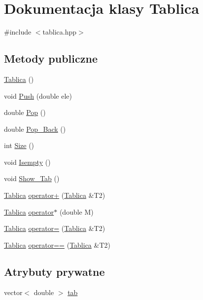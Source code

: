 \hypertarget{class_tablica}{\section{Dokumentacja klasy Tablica}
\label{class_tablica}
}


{\ttfamily \#include $<$tablica.\-hpp$>$}

\subsection*{Metody publiczne}
\begin{DoxyCompactItemize}
\item 
\hyperlink{class_tablica_a5f484e7b0478e1ff9b62e894f9d7b28d}{Tablica} ()
\item 
void \hyperlink{class_tablica_ae1af903a66629cd0d522eb9f2fd13116}{Push} (double ele)
\item 
double \hyperlink{class_tablica_a6153881ffda3f5361c2d664622a4eff4}{Pop} ()
\item 
double \hyperlink{class_tablica_a899c8e69cb97bd027c1c05140cd304ec}{Pop\-\_\-\-Back} ()
\item 
int \hyperlink{class_tablica_a8598f952095406441bfd2d20e76f175c}{Size} ()
\item 
void \hyperlink{class_tablica_a08b59415756d2dc7da781124809d8eb4}{Isempty} ()
\item 
void \hyperlink{class_tablica_a06c551a7e0220dde2f29cce06fb96209}{Show\-\_\-\-Tab} ()
\item 
\hyperlink{class_tablica}{Tablica} \hyperlink{class_tablica_a15c072e7160bfbdbc5d103cf0ebd6e76}{operator+} (\hyperlink{class_tablica}{Tablica} \&T2)
\item 
\hyperlink{class_tablica}{Tablica} \hyperlink{class_tablica_acabfd453d919950051b8a9cf4aac642e}{operator$\ast$} (double M)
\item 
\hyperlink{class_tablica}{Tablica} \hyperlink{class_tablica_a53bd7c9853f01a78ba2aff61ece4ccbf}{operator=} (\hyperlink{class_tablica}{Tablica} \&T2)
\item 
\hyperlink{class_tablica}{Tablica} \hyperlink{class_tablica_ae5d9fdf31df882eae683abc89fec01ad}{operator==} (\hyperlink{class_tablica}{Tablica} \&T2)
\end{DoxyCompactItemize}
\subsection*{Atrybuty prywatne}
\begin{DoxyCompactItemize}
\item 
vector$<$ double $>$ \hyperlink{class_tablica_aaa8c514d3b76071eefab059a49de706a}{tab}
\end{DoxyCompactItemize}


